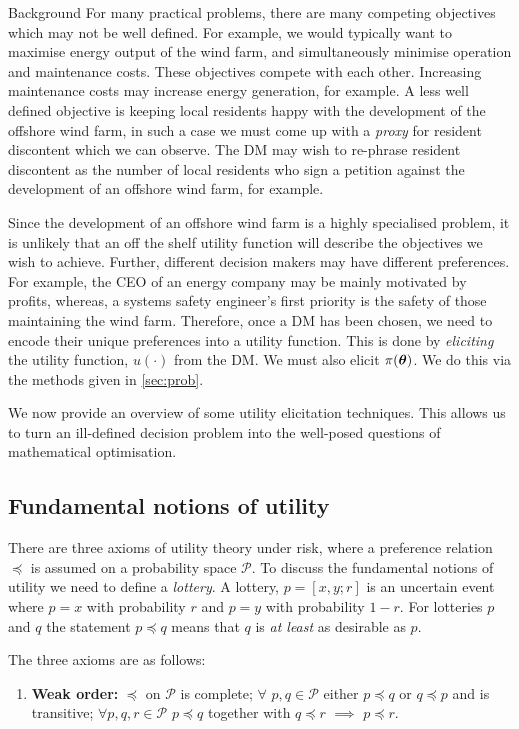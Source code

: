 \begin{chapter}{Background \label{Ch:background}}
For many practical problems, there are many competing objectives which may not be well defined. For example, we would typically want to maximise energy output of the wind farm, and simultaneously minimise operation and maintenance costs. These objectives compete with each other. Increasing maintenance costs may increase energy generation, for example. A less well defined objective is keeping local residents happy with the development of the offshore wind farm, in such a case we must come up with a \textit{proxy} for resident discontent which we can observe. The DM may wish to re-phrase resident discontent as the number of local residents who sign a petition against the development of an offshore wind farm, for example.

Since the development of an offshore wind farm is a highly specialised problem, it is unlikely that an off the shelf utility function will describe the objectives we wish to achieve. Further, different decision makers may have different preferences. For example, the CEO of an energy company may be mainly motivated by profits, whereas, a systems safety engineer's first priority is the safety of those maintaining the wind farm. Therefore, once a DM has been chosen, we need to encode their unique preferences into a utility function. This is done by \textit{eliciting} the utility function, $u(\cdot)$ from the DM. We must also elicit $\pi(\bm{\theta})$. We do this via the methods given in \cref{sec:prob}.

We now provide an overview of some utility elicitation techniques. This allows us to turn an ill-defined decision problem into the well-posed questions of mathematical optimisation.

\subsection{Fundamental notions of utility}

There are three axioms of utility theory under risk, where a preference relation $\preceq$ is assumed on a probability space $\mathcal{P}$. To discuss the fundamental notions of utility we need to define a \textit{lottery}. A lottery, $p = [x, y; r]$ is an uncertain event where $p = x$ with probability $r$ and $p = y$ with probability $1-r$. For lotteries $p$ and $q$ the statement $p \preceq q$ means that $q$ is \textit{at least} as desirable as $p$. 

The three axioms are as follows:
\begin{enumerate}
\item \textbf{Weak order:} $\preceq$ on $\mathcal{P}$ is complete; $\forall$ $p, q \in \mathcal{P}$ either $p \preceq q$ or $q \preceq p$ and is transitive; $\forall p, q, r \in \mathcal{P}$  $p \preceq q$ together with $q \preceq r$ $\implies$ $p \preceq r$.


\end{enumerate}
\end{chapter}
